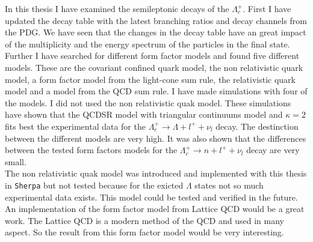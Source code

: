 In this thesis I have examined the semileptonic decays of the \(\Lambda_c^+\).
First I have updated the decay table with the latest branching ratios and 
decay channels from the PDG. We have seen that the changes in the decay table have an 
great impact of the multiplicity and the energy spectrum of the particles in 
the final state.\\
Further I have searched for different form factor models and found five 
different models. These are the covariant confined quark model, the non 
relativistic quark model, a form factor model from the light-cone sum rule, 
the relativistic quark model and a model from the QCD sum rule. I have made 
simulations with four of the models. I did not used the non relativistic quak model.
These simulations have shown that the QCDSR model with triangular continuums model 
and \(\kappa = 2\) fits best the experimental data for the 
\(\Lambda_c^+ \rightarrow \Lambda + l^+ + \nu_l\) decay. The destinction between 
the different models are very high. It was also shown that 
the differences between the tested form factors models for the 
\(\Lambda_c^+ \rightarrow n + l^+ + \nu_l\) decay are very small.\\

The non relativistic quak model \cite{NRQM} was introduced and implemented with 
this thesis in \texttt{Sherpa} but not tested because for the exicted \(\Lambda\) states 
 not so much experimental data exists. This model could be tested and verified
 in the future.
An implementation of the form factor model from Lattice QCD \cite{Lattice_QCD} would be a great work. 
The Lattice QCD is a modern method of the QCD and used in many aspect. So 
the result from this form factor model would be very interesting.
